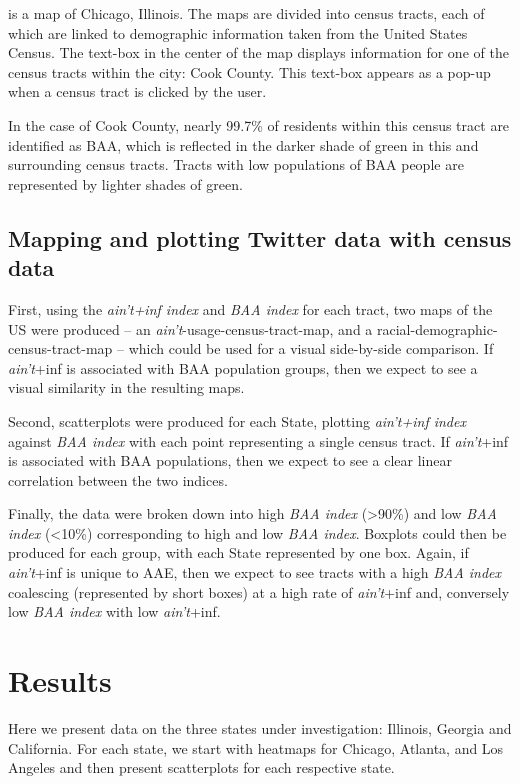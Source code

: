 \documentclass[output=paper,colorlinks,citecolor=brown,draftmode]{langscibook}
\begin{document}
 is a map of Chicago, Illinois. The maps are divided into census tracts, each of which are linked to demographic information taken from the United States Census. The text-box in the center of the map displays information for one of the census tracts within the city: Cook County. This text-box appears as a pop-up when a census tract is clicked by the user.

In the case of Cook County, nearly 99.7\% of residents within this census tract are identified as BAA, which is reflected in the darker shade of green in this and surrounding census tracts.  Tracts with low populations of BAA people are represented by lighter shades of green.

\subsection{Mapping and plotting Twitter data with census data}
First, using the \textit{ain't+inf index} and \textit{BAA index} for each tract, two maps of the US were produced -- an \textit{ain’t}-usage-census-tract-map, and a racial-demographic-census-tract-map -- which could be used for a visual side-by-side comparison. If \textit{ain't}+inf is associated with BAA population groups, then we expect to see a visual similarity in the resulting maps.

Second, scatterplots were produced for each State, plotting \textit{ain't+inf index} against \textit{BAA index} with each point representing a single census tract.  If \textit{ain't}+inf is associated with BAA populations, then we expect to see a clear linear correlation between the two indices.

Finally, the data were broken down into high \textit{BAA index} (>90\%) and low \textit{BAA index} (<10\%) corresponding to high and low \textit{BAA index}. Boxplots could then be produced for each group, with each State represented by one box. Again, if \textit{ain't}+inf is unique to AAE, then we expect to see tracts with a high \textit{BAA index} coalescing (represented by short boxes) at a high rate of \textit{ain't}+inf and, conversely low \textit{BAA index} with low \textit{ain't}+inf.

\section{Results}
Here we present data on the three states under investigation: Illinois, Georgia and California. For each state, we start with heatmaps for Chicago, Atlanta, and Los Angeles and then present scatterplots for each respective state.  
\end{document}
